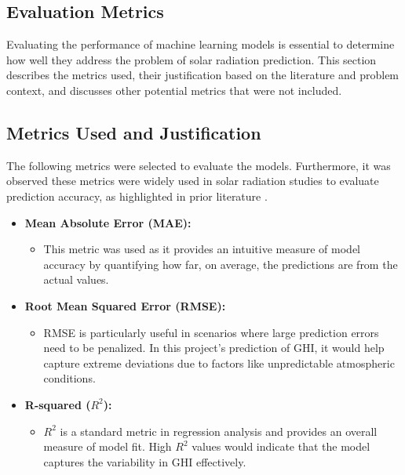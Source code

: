 \documentclass[10pt,twocolumn]{article}
\begin{document}
\begin{itemize}
\section*{Evaluation Metrics}

Evaluating the performance of machine learning models is essential to determine how well they address the problem of solar radiation prediction. This section describes the metrics used, their justification based on the literature and problem context, and discusses other potential metrics that were not included.

\subsection*{Metrics Used and Justification}

The following metrics were selected to evaluate the models. Furthermore, it was observed these metrics were widely used in solar radiation studies to evaluate prediction accuracy, as highlighted in prior literature \cite{4}\cite{3}\cite{5}.
\begin{itemize}
    \item \textbf{Mean Absolute Error (MAE):}
    \begin{itemize}
        \item This metric was used as it provides an intuitive measure of model accuracy by quantifying how far, on average, the predictions are from the actual values. 
    \end{itemize}

    \item \textbf{Root Mean Squared Error (RMSE):}
    \begin{itemize}
        \item  RMSE is particularly useful in scenarios where large prediction errors need to be penalized. In this project's prediction of GHI, it would help capture extreme deviations due to factors like unpredictable atmospheric conditions.
    \end{itemize}

    \item \textbf{R-squared (\( R^2 \)):}
    \begin{itemize}
        \item \textbf \( R^2 \) is a standard metric in regression analysis and provides an overall measure of model fit. High \( R^2 \) values would indicate that the model captures the variability in GHI effectively.
    \end{itemize}


\end{itemize}
\end{itemize}
\end{document}
